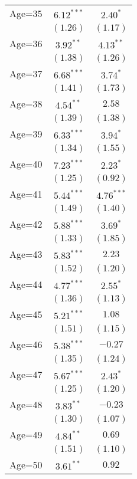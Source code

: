 \documentclass[fullpage]{paper}
\begin{document}
\begin{center}
\begin{longtable}{l c c }
Age=35      & $6.12^{***}$ & $2.40^{*}$    \\
            & $(1.26)$     & $(1.17)$      \\
Age=36      & $3.92^{**}$  & $4.13^{**}$   \\
            & $(1.38)$     & $(1.26)$      \\
Age=37      & $6.68^{***}$ & $3.74^{*}$    \\
            & $(1.41)$     & $(1.73)$      \\
Age=38      & $4.54^{**}$  & $2.58$        \\
            & $(1.39)$     & $(1.38)$      \\
Age=39      & $6.33^{***}$ & $3.94^{*}$    \\
            & $(1.34)$     & $(1.55)$      \\
Age=40      & $7.23^{***}$ & $2.23^{*}$    \\
            & $(1.25)$     & $(0.92)$      \\
Age=41      & $5.44^{***}$ & $4.76^{***}$  \\
            & $(1.49)$     & $(1.40)$      \\
Age=42      & $5.88^{***}$ & $3.69^{*}$    \\
            & $(1.33)$     & $(1.85)$      \\
Age=43      & $5.83^{***}$ & $2.23$        \\
            & $(1.52)$     & $(1.20)$      \\
Age=44      & $4.77^{***}$ & $2.55^{*}$    \\
            & $(1.36)$     & $(1.13)$      \\
Age=45      & $5.21^{***}$ & $1.08$        \\
            & $(1.51)$     & $(1.15)$      \\
Age=46      & $5.38^{***}$ & $-0.27$       \\
            & $(1.35)$     & $(1.24)$      \\
Age=47      & $5.67^{***}$ & $2.43^{*}$    \\
            & $(1.25)$     & $(1.20)$      \\
Age=48      & $3.83^{**}$  & $-0.23$       \\
            & $(1.30)$     & $(1.07)$      \\
Age=49      & $4.84^{**}$  & $0.69$        \\
            & $(1.51)$     & $(1.10)$      \\
Age=50      & $3.61^{**}$  & $0.92$        \\

\end{longtable}
\end{center}
\end{document}
